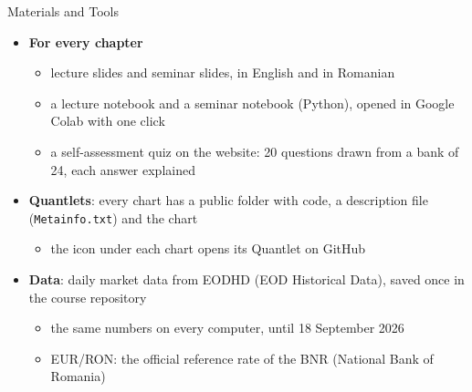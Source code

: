 \begin{frame}{Materials and Tools}
\itemsize{\small}
\begin{itemize}
    \item \textbf{For every chapter}
    \begin{itemize}
        \item lecture slides and seminar slides, in English and in Romanian
        \item a lecture notebook and a seminar notebook (Python), opened in Google Colab with one click
        \item a self-assessment quiz on the website: 20 questions drawn from a bank of 24, each answer explained
    \end{itemize}
    \item \textbf{Quantlets}: every chart has a public folder with code, a description file (\texttt{Metainfo.txt}) and the chart
    \begin{itemize}
        \item the icon under each chart opens its Quantlet on GitHub
    \end{itemize}
    \item \hypertarget{ch0-materials}{}\textbf{Data}: daily market data from EODHD (EOD Historical Data), saved once in the course repository
    \begin{itemize}
        \item the same numbers on every computer, until 18 September 2026
        \item EUR/RON: the official reference rate of the BNR (National Bank of Romania)
    \end{itemize}
\end{itemize}
\end{frame}

